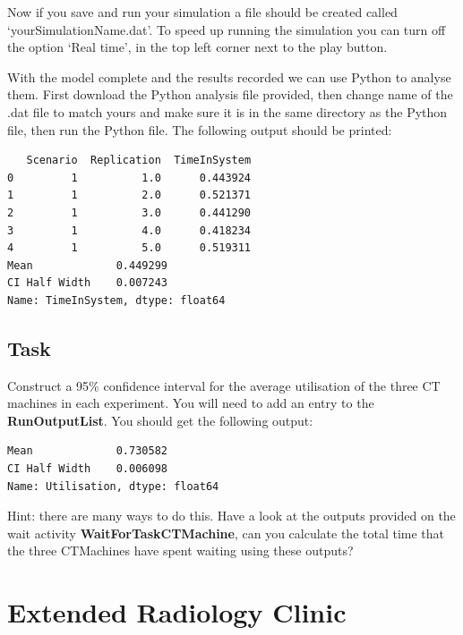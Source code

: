 \documentclass[
  10pt,
  a4paperpaper,
  DIV=11,
  numbers=noendperiod,
  oneside]{scrreprt}
\begin{document}
Now if you save and run your simulation a file should be created called
`yourSimulationName.dat'. To speed up running the simulation you can
turn off the option `Real time', in the top left corner next to the play
button.

With the model complete and the results recorded we can use Python to
analyse them. First download the Python analysis file provided, then
change name of the .dat file to match yours and make sure it is in the
same directory as the Python file, then run the Python file. The
following output should be printed:

\begin{codeout}

\begin{verbatim}
   Scenario  Replication  TimeInSystem
0         1          1.0      0.443924
1         1          2.0      0.521371
2         1          3.0      0.441290
3         1          4.0      0.418234
4         1          5.0      0.519311
Mean             0.449299
CI Half Width    0.007243
Name: TimeInSystem, dtype: float64
\end{verbatim}

\end{codeout}

\section{Task}\label{task}

Construct a 95\% confidence interval for the average utilisation of the
three CT machines in each experiment. You will need to add an entry to
the \textbf{RunOutputList}. You should get the following output:

\begin{codeout}

\begin{verbatim}
Mean             0.730582
CI Half Width    0.006098
Name: Utilisation, dtype: float64
\end{verbatim}

\end{codeout}

Hint: there are many ways to do this. Have a look at the outputs
provided on the wait activity \textbf{WaitForTaskCTMachine}, can you
calculate the total time that the three CTMachines have spent waiting
using these outputs?

\chapter{Extended Radiology Clinic}\label{extended-radiology-clinic}
\end{document}
